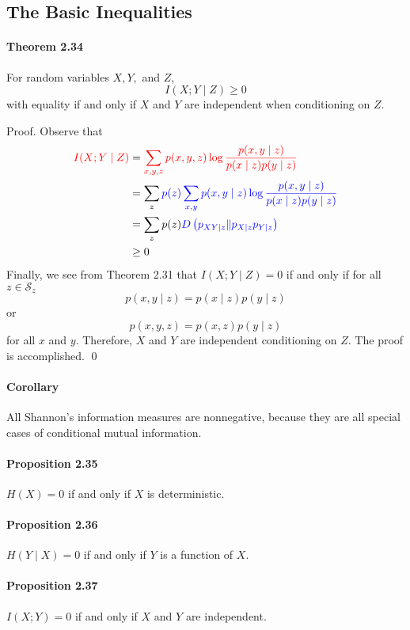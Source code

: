 \documentclass[8pt]{article}
\begin{document}
\subsection{The Basic Inequalities}
\begin{tcolorbox}
\paragraph{Theorem 2.34} For random variables $X, Y,$ and $Z$,
$$
I(X ; Y \mid Z) \geq 0
$$
with equality if and only if $X$ and $Y$ are independent when conditioning on $Z$.
\end{tcolorbox}
Proof. Observe that
$$
\begin{aligned}
\color{red} I(X ; Y \mid Z) &= \color{red} \sum_{x, y, z} p(x, y, z) \log \frac{p(x, y \mid z)}{p(x \mid z) p(y \mid z)} \\
&=\sum_{z} \color{blue} p(z) \sum_{x, y} p(x, y \mid z) \log \frac{p(x, y \mid z)}{p(x \mid z) p(y \mid z)} \\
&=\sum_{z} p(z) \color{blue} D\left(p_{X Y \mid z} \| p_{X \mid z} p_{Y \mid z}\right) \\ &\geq 0
\end{aligned} 
$$
Finally, we see from Theorem 2.31 that $I(X ; Y \mid Z)=0$ if and only if for all $z \in \mathcal{S}_{z}$
$$
p(x, y \mid z)=p(x \mid z) p(y \mid z)
$$
or
$$
p(x, y, z)=p(x, z) p(y \mid z)
$$
for all $x$ and $y .$ Therefore, $X$ and $Y$ are independent conditioning on $Z .$ The proof is accomplished. \qed
\paragraph{Corollary} All Shannon's information measures are nonnegative, because they are all special cases of conditional mutual information.

\begin{tcolorbox}
\paragraph{Proposition 2.35} $H(X)=0$ if and only if $X$ is deterministic.
\paragraph{Proposition 2.36} $H(Y \mid X)=0$ if and only if $Y$ is a function of $X$.
\paragraph{Proposition 2.37} $I(X ; Y)=0$ if and only if $X$ and $Y$ are independent.
\end{tcolorbox}
\end{document}
